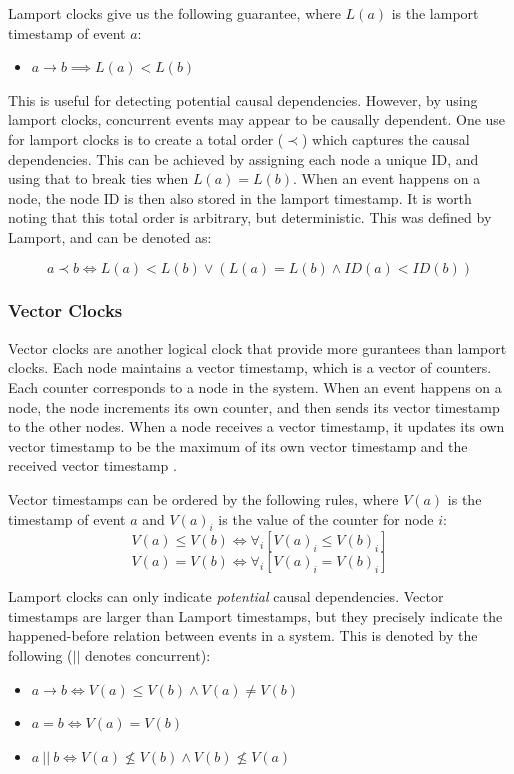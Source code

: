 \documentclass[12pt]{article}
\begin{document}
Lamport clocks give us the following guarantee, where $L(a)$ is the lamport timestamp of event $a$: 
\begin{itemize}
    \item $a \rightarrow b \implies  L(a) < L(b)$
\end{itemize}
This is useful for detecting potential causal dependencies. However, by using lamport clocks, concurrent events may appear to be causally dependent. One use for lamport clocks is to create a total order ($\prec$) which captures the causal dependencies. This can be achieved by assigning each node a unique ID, and using that to break ties when $L(a) = L(b)$. When an event happens on a node, the node ID is then also stored in the lamport timestamp. It is worth noting that this total order is arbitrary, but deterministic. This was defined by Lamport\cite{lamport1978time}, and can be denoted as:\par
\[a \prec b \iff L(a) < L(b) \lor (L(a) = L(b) \land ID(a) < ID(b))\]

\subsubsection{Vector Clocks}
Vector clocks are another logical clock that provide more gurantees than lamport clocks. Each node maintains a vector timestamp, which is a vector of counters. Each counter corresponds to a node in the system.
When an event happens on a node, the node increments its own counter, and then sends its vector timestamp to the other nodes. When a node receives a vector timestamp, it updates its own vector timestamp to be the maximum of its own vector timestamp and the received vector timestamp \cite{mattern1989virtual}.\par

Vector timestamps can be ordered by the following rules, where $V(a)$ is the timestamp of event $a$ and $V(a)_i$ is the value of the counter for node $i$:
\[V(a) \leq V(b) \iff \forall_i [V(a)_i \leq V(b)_i]  \]
\[V(a) = V(b) \iff \forall_i [V(a)_i = V(b)_i]\]

Lamport clocks can only indicate \emph{potential} causal dependencies. Vector timestamps are larger than Lamport timestamps, but they precisely indicate the happened-before relation between events in a system. This is denoted by the following ($\vert \vert$ denotes concurrent):

\begin{itemize}
    \item $a \rightarrow b \iff V(a) \leq V(b) \land V(a) \not = V(b)$
    \item $a = b \iff V(a) = V(b)$
    \item $a \: || \:  b \iff V(a) \not \leq V(b) \land V(b) \not \leq V(a)$
\end{itemize}
\end{document}
